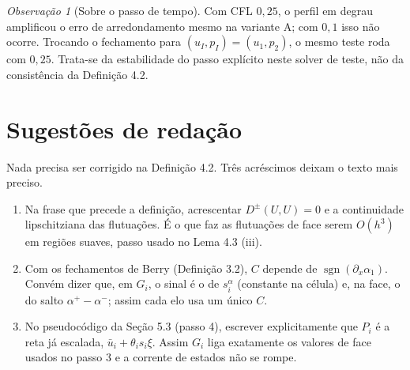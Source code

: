 \documentclass[11pt,a4paper]{article}
\theoremstyle{definition}
\theoremstyle{remark}
\newtheorem{observacao}[definicao]{Observação}
\newcommand{\ub}{\bar u}
\begin{document}
\begin{observacao}[Sobre o passo de tempo]
Com CFL $0{,}25$, o perfil em degrau amplificou o erro de arredondamento mesmo na variante A; com $0{,}1$ isso não ocorre. Trocando o fechamento para $(u_I,p_I)=(u_1,p_2)$, o mesmo teste roda com $0{,}25$. Trata-se da estabilidade do passo explícito neste solver de teste, não da consistência da Definição 4.2.
\end{observacao}

\section{Sugestões de redação}

Nada precisa ser corrigido na Definição 4.2. Três acréscimos deixam o texto mais preciso.
\begin{enumerate}
\item Na frase que precede a definição, acrescentar $D^\pm(U,U)=0$ e a continuidade lipschitziana das flutuações. É o que faz as flutuações de face serem $O(h^3)$ em regiões suaves, passo usado no Lema 4.3 (iii).
\item Com os fechamentos de Berry (Definição 3.2), $C$ depende de $\operatorname{sgn}(\partial_x\alpha_1)$. Convém dizer que, em $G_i$, o sinal é o de $s_i^\alpha$ (constante na célula) e, na face, o do salto $\alpha^+-\alpha^-$; assim cada elo usa um único $C$.
\item No pseudocódigo da Seção 5.3 (passo 4), escrever explicitamente que $P_i$ é a reta já escalada, $\ub_i+\theta_is_i\xi$. Assim $G_i$ liga exatamente os valores de face usados no passo 3 e a corrente de estados não se rompe.
\end{enumerate}

\end{document}
